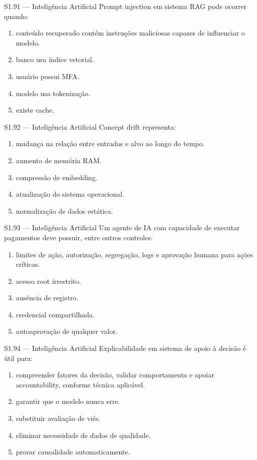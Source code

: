 \begin{questao}{S1.91 — Inteligência Artificial}
Prompt injection em sistema RAG pode ocorrer quando:
\begin{enumerate}[label=\Alph*)]\item conteúdo recuperado contém instruções maliciosas capazes de influenciar o modelo.\item banco usa índice vetorial.\item usuário possui MFA.\item modelo usa tokenização.\item existe cache.\end{enumerate}
\end{questao}

\begin{questao}{S1.92 — Inteligência Artificial}
Concept drift representa:
\begin{enumerate}[label=\Alph*)]\item mudança na relação entre entradas e alvo ao longo do tempo.\item aumento de memória RAM.\item compressão de embedding.\item atualização do sistema operacional.\item normalização de dados estática.\end{enumerate}
\end{questao}

\begin{questao}{S1.93 — Inteligência Artificial}
Um agente de IA com capacidade de executar pagamentos deve possuir, entre outros controles:
\begin{enumerate}[label=\Alph*)]\item limites de ação, autorização, segregação, logs e aprovação humana para ações críticas.\item acesso root irrestrito.\item ausência de registro.\item credencial compartilhada.\item autoaprovação de qualquer valor.\end{enumerate}
\end{questao}

\begin{questao}{S1.94 — Inteligência Artificial}
Explicabilidade em sistema de apoio à decisão é útil para:
\begin{enumerate}[label=\Alph*)]\item compreender fatores da decisão, validar comportamento e apoiar accountability, conforme técnica aplicável.\item garantir que o modelo nunca erre.\item substituir avaliação de viés.\item eliminar necessidade de dados de qualidade.\item provar causalidade automaticamente.\end{enumerate}
\end{questao}

